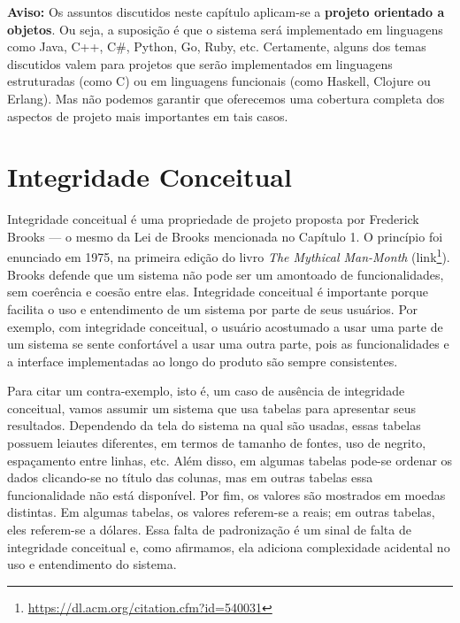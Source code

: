 \documentclass[
  11pt,
  twoside]{book}
\DeclareRobustCommand{\href}[2]{#2\footnote{\url{#1}}}
\newenvironment{aviso}{\centering \vspace{1.5ex} \begin{tcolorbox}[breakable, colback=backcolor, width=4.9in]}{\end{tcolorbox} \vspace{1.5ex}}
\begin{document}

\begin{aviso} 

\textbf{Aviso:} Os assuntos discutidos neste capítulo aplicam-se a
\textbf{projeto orientado a objetos}. Ou seja, a suposição é que o
sistema será implementado em linguagens como Java, C++, C\#, Python, Go,
Ruby, etc. Certamente, alguns dos temas discutidos valem para projetos
que serão implementados em linguagens estruturadas (como C) ou em
linguagens funcionais (como Haskell, Clojure ou Erlang). Mas não podemos
garantir que oferecemos uma cobertura completa dos aspectos de projeto
mais importantes em tais casos.

\end{aviso} 

\hypertarget{integridade-conceitual}{%
\section{Integridade Conceitual}\label{integridade-conceitual}}

 Integridade conceitual é uma propriedade
de projeto proposta por Frederick Brooks --- o mesmo da Lei de Brooks
mencionada no Capítulo 1. O princípio foi enunciado em 1975, na primeira
edição do livro \emph{The Mythical Man-Month}
(\href{https://dl.acm.org/citation.cfm?id=540031}{link}). Brooks defende
que um sistema não pode ser um amontoado de funcionalidades, sem
coerência e coesão entre elas. Integridade conceitual é importante
porque facilita o uso e entendimento de um sistema por parte de seus
usuários. Por exemplo, com integridade conceitual, o usuário acostumado
a usar uma parte de um sistema se sente confortável a usar uma outra
parte, pois as funcionalidades e a interface implementadas ao longo do
produto são sempre consistentes.

Para citar um contra-exemplo, isto é, um caso de ausência de integridade
conceitual, vamos assumir um sistema que usa tabelas para apresentar
seus resultados. Dependendo da tela do sistema na qual são usadas, essas
tabelas possuem leiautes diferentes, em termos de tamanho de fontes, uso
de negrito, espaçamento entre linhas, etc. Além disso, em algumas
tabelas pode-se ordenar os dados clicando-se no título das colunas, mas
em outras tabelas essa funcionalidade não está disponível. Por fim, os
valores são mostrados em moedas distintas. Em algumas tabelas, os
valores referem-se a reais; em outras tabelas, eles referem-se a
dólares. Essa falta de padronização é um sinal de falta de integridade
conceitual e, como afirmamos, ela adiciona complexidade acidental no uso
e entendimento do sistema.
\end{document}
